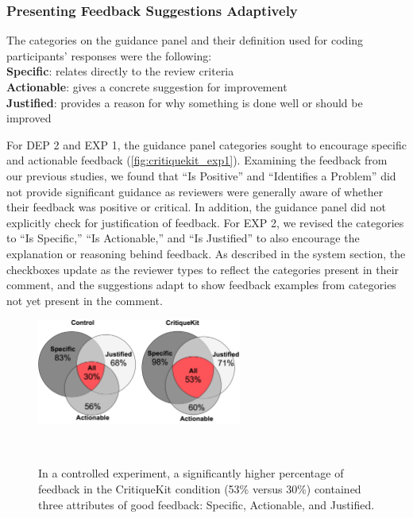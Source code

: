 \subsubsection{Presenting Feedback Suggestions Adaptively}
The categories on the guidance panel and their definition used for coding participants' responses were the following:\\
\textbf{Specific}: relates directly to the review criteria\\
\textbf{Actionable}: gives a concrete suggestion for improvement\\
\textbf{Justified}: provides a reason for why something is done well or should be improved

For DEP 2 and EXP 1, the guidance panel categories sought to encourage specific and actionable feedback (\autoref{fig:critiquekit_exp1}). Examining the feedback from our previous studies, we found that ``Is Positive'' and ``Identifies a Problem'' did not provide significant guidance as reviewers were generally aware of whether their feedback was positive or critical. In addition, the guidance panel did not explicitly check for justification of feedback. For EXP 2, we revised the categories to ``Is Specific,'' ``Is Actionable,'' and ``Is Justified'' to also encourage the explanation or reasoning behind feedback. As described in the system section, the checkboxes update as the reviewer types to reflect the categories present in their comment, and the suggestions adapt to show feedback examples from categories not yet present in the comment. 

\begin{figure}
\centering
  \includegraphics[width=0.6\textwidth]{critiquekit/figures/venn_diagram_exp2.png}
  \caption{In a controlled experiment, a significantly higher percentage of feedback in the CritiqueKit condition (53\% versus 30\%) contained three attributes of good feedback: Specific, Actionable, and Justified.}~\label{fig:critiquekit_exp2}
\end{figure}

